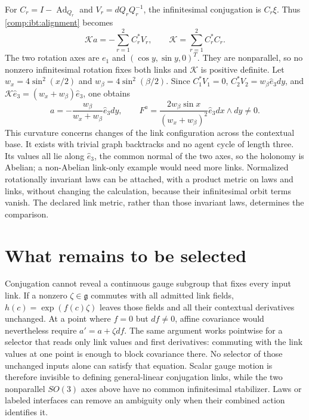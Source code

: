For $C_r=I-\operatorname{Ad}_{Q_r}$ and $V_r=dQ_rQ_r^{-1}$, the infinitesimal conjugation is $C_r\xi$. Thus \cref{comp:ibt:alignment} becomes
\begin{equation}
\mathcal K a=-\sum_{r=1}^2 C_r^*V_r,\qquad
\mathcal K=\sum_{r=1}^2 C_r^*C_r.
\end{equation}
The two rotation axes are $e_1$ and $(\cos y,\sin y,0)^T$. They are nonparallel, so no nonzero infinitesimal rotation fixes both links and $\mathcal K$ is positive definite. Let $w_x=4\sin^2(x/2)$ and $w_\beta=4\sin^2(\beta/2)$. Since $C_1^*V_1=0$, $C_2^*V_2=w_\beta\widehat e_3dy$, and $\mathcal K\widehat e_3=(w_x+w_\beta)\widehat e_3$, one obtains
\begin{equation}
a=-\frac{w_\beta}{w_x+w_\beta}\widehat e_3dy,\qquad
F^a=\frac{2w_\beta\sin x}{(w_x+w_\beta)^2}\widehat e_3dx\wedge dy\ne0.
\end{equation}
This curvature concerns changes of the link configuration across the contextual base. It exists with trivial graph backtracks and no agent cycle of length three. Its values all lie along $\widehat e_3$, the common normal of the two axes, so the holonomy is Abelian; a non-Abelian link-only example would need more links. Normalized rotationally invariant laws can be attached, with a product metric on laws and links, without changing the calculation, because their infinitesimal orbit terms vanish. The declared link metric, rather than those invariant laws, determines the comparison.

\section{What remains to be selected}

Conjugation cannot reveal a continuous gauge subgroup that fixes every input link. If a nonzero $\zeta\in\mathfrak g$ commutes with all admitted link fields, $h(c)=\exp(f(c)\zeta)$ leaves those fields and all their contextual derivatives unchanged. At a point where $f=0$ but $df\ne0$, affine covariance would nevertheless require $a'=a+\zeta df$. The same argument works pointwise for a selector that reads only link values and first derivatives: commuting with the link values at one point is enough to block covariance there. No selector of those unchanged inputs alone can satisfy that equation. Scalar gauge motion is therefore invisible to defining general-linear conjugation links, while the two nonparallel $SO(3)$ axes above have no common infinitesimal stabilizer. Laws or labeled interfaces can remove an ambiguity only when their combined action identifies it.

